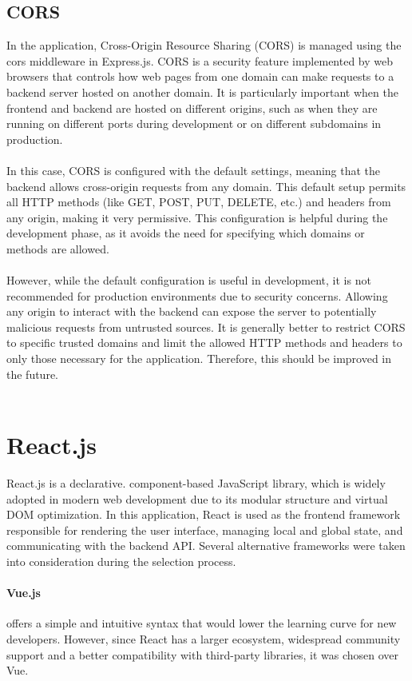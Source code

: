 \documentclass[a4paper,12pt]{report}
\begin{document}
\subsection{CORS}
In the application, Cross-Origin Resource Sharing (CORS) is managed using the cors middleware in Express.js. CORS is a security feature implemented by web browsers that controls how web pages from one domain can make requests to a backend server hosted on another domain. It is particularly important when the frontend and backend are hosted on different origins, such as when they are running on different ports during development or on different subdomains in production. \\ \\
In this case, CORS is configured with the default settings, meaning that the backend allows cross-origin requests from any domain. This default setup permits all HTTP methods (like GET, POST, PUT, DELETE, etc.) and headers from any origin, making it very permissive. This configuration is helpful during the development phase, as it avoids the need for specifying which domains or methods are allowed. \\ \\
However, while the default configuration is useful in development, it is not recommended for production environments due to security concerns. Allowing any origin to interact with the backend can expose the server to potentially malicious requests from untrusted sources. It is generally better to restrict CORS to specific trusted domains and limit the allowed HTTP methods and headers to only those necessary for the application. Therefore, this should be improved in the future. \cite{mdn-cors} \\ \\

\section{React.js}
React.js is a declarative. component-based JavaScript library, which is widely adopted in modern web development due to its modular structure and virtual DOM optimization. In this application, React is used as the frontend framework responsible for rendering the user interface, managing local and global state, and communicating with the backend API. Several alternative frameworks were taken into consideration during the selection process. \cite{react-docs}
\paragraph{Vue.js} offers a simple and intuitive syntax that would lower the learning curve for new developers. However, since React has a larger ecosystem, widespread community support and a better compatibility with third-party libraries, it was chosen over Vue. \cite{react-docs} \cite{vue-docs}
\end{document}
